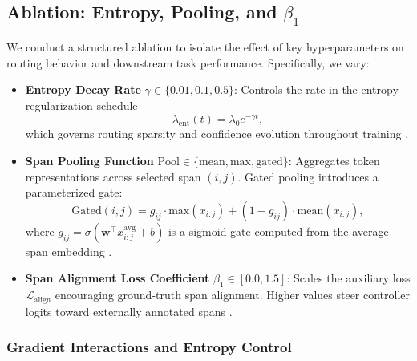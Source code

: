 \subsection{Ablation: Entropy, Pooling, and \texorpdfstring{$\beta_1$}{β₁}}
\label{sec:ablation}

We conduct a structured ablation to isolate the effect of key hyperparameters on routing behavior and downstream task performance. Specifically, we vary:

\begin{itemize}[leftmargin=1.5em]
  \item \textbf{Entropy Decay Rate} \(\gamma \in \{0.01, 0.1, 0.5\}\): Controls the rate in the entropy regularization schedule
  \begin{equation}
  \lambda_{\mathrm{ent}}(t) = \lambda_0 e^{-\gamma t},
  \label{eq:entropy_decay_exp}
  \end{equation}
  which governs routing sparsity and confidence evolution throughout training \cite{grandvalet2006entropy, pereyra2017regularizing}.

  \item \textbf{Span Pooling Function} \(\mathrm{Pool} \in \{\mathrm{mean}, \mathrm{max}, \mathrm{gated}\}\): Aggregates token representations across selected span \((i, j)\). Gated pooling introduces a parameterized gate:
  \begin{equation}
  \text{Gated}(i, j) = g_{ij} \cdot \mathrm{max}(x_{i:j}) + (1 - g_{ij}) \cdot \mathrm{mean}(x_{i:j}),
  \label{eq:gated_pooling}
  \end{equation}
  where \(g_{ij} = \sigma(\mathbf{w}^\top x_{i:j}^{\text{avg}} + b)\) is a sigmoid gate computed from the average span embedding \cite{kim2019unsupervised, zilliz2023pooling}.

  \item \textbf{Span Alignment Loss Coefficient} \(\beta_1 \in [0.0, 1.5]\): Scales the auxiliary loss \(\mathcal{L}_{\text{align}}\) encouraging ground-truth span alignment. Higher values steer controller logits toward externally annotated spans \cite{liu2024structured}.
\end{itemize}



\subsubsection*{Gradient Interactions and Entropy Control}

